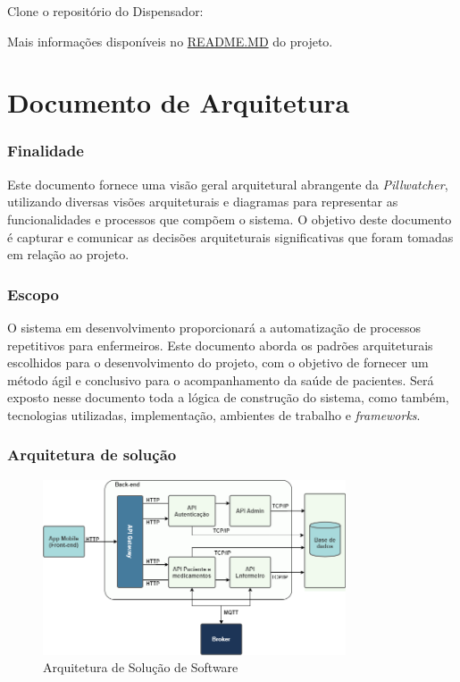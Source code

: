 \begin{apendicesenv}
Clone o repositório do Dispensador:

Mais informações disponíveis no \href{https://github.com/PillWatcher/pillwatcher-dpb-admin-service}{README.MD} do projeto.

\chapter{Documento de Arquitetura}

\subsection*{Finalidade}

Este documento fornece uma visão geral arquitetural abrangente da \textit{Pillwatcher}, utilizando diversas visões arquiteturais e diagramas para representar as funcionalidades e processos que compõem o sistema. O objetivo deste documento é capturar e comunicar as decisões arquiteturais significativas que foram tomadas em relação ao projeto.

\subsection*{Escopo}

O sistema em desenvolvimento proporcionará a automatização de processos repetitivos para enfermeiros. Este documento aborda os padrões arquiteturais escolhidos para o desenvolvimento do projeto, com o objetivo de fornecer um método ágil e conclusivo para o acompanhamento da saúde de pacientes. Será exposto nesse documento toda a lógica de construção do sistema, como também, tecnologias utilizadas, implementação, ambientes de trabalho e \textit{frameworks}.

\subsection*{Arquitetura de solução}

\begin{figure}[H]
    \centering
    \includegraphics[width=0.8\textwidth]{figuras/software/solucao_software_2.png}
    \caption{Arquitetura de Solução de Software}
    \label{fig:software_solution_apdc}
\end{figure}


\end{apendicesenv}
